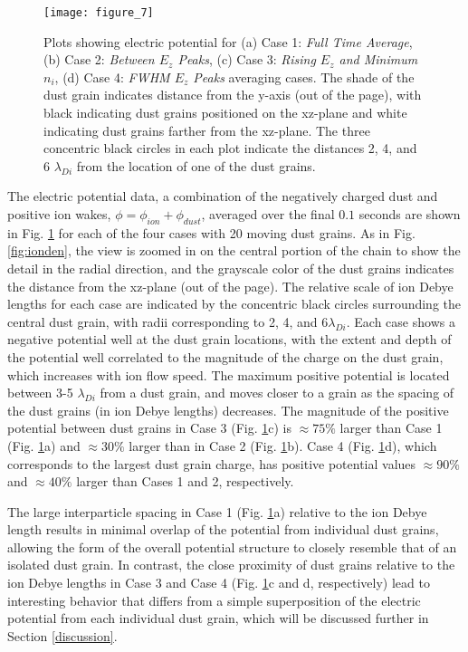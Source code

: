 \documentclass[aip,amsmath,amssymb,graphicx,floatfix,reprint]{revtex4-1}
\begin{document}
\begin{figure}[t]
\texttt{[image: figure\_7]}
\caption{Plots showing electric potential for (a) Case 1: \emph{Full Time Average}, (b) Case 2: \emph{Between $E_z$ Peaks}, (c) Case 3: \emph{Rising $E_z$ and Minimum $n_i$}, (d) Case 4: \emph{FWHM $E_z$ Peaks} averaging cases. The shade of the dust grain indicates distance from the y-axis (out of the page), with black indicating dust grains positioned on the xz-plane and white indicating dust grains farther from the xz-plane.  The three concentric black circles in each plot indicate the distances 2, 4, and 6 $\lambda_{Di}$ from the location of one of the dust grains.}
\label{fig:totalpotential}
\end{figure}
 
 The electric potential data, a combination of the negatively charged dust and positive ion wakes, $\phi = \phi_{ion} + \phi_{dust}$, averaged over the final $0.1$ seconds are shown in Fig. \ref{fig:totalpotential} for each of the four cases with 20 moving dust grains.  As in Fig. \ref{fig:ionden}, the view is zoomed in on the central portion of the chain to show the detail in the radial direction, and the grayscale color of the dust grains indicates the distance from the xz-plane (out of the page).  The relative scale of ion Debye lengths for each case are indicated by the concentric black circles surrounding the central dust grain, with radii corresponding to 2, 4, and 6$\lambda_{Di}$.  Each case shows a negative potential well at the dust grain locations, with the extent and depth of the potential well correlated to the magnitude of the charge on the dust grain, which increases with ion flow speed.  The maximum positive potential is located between 3-5 $\lambda_{Di}$ from a dust grain, and moves closer to a grain as the spacing of the dust grains (in ion Debye lengths) decreases. The magnitude of the positive potential between dust grains in Case 3 (Fig. \ref{fig:totalpotential}c) is $\approx 75\%$ larger than Case 1 (Fig. \ref{fig:totalpotential}a) and $\approx 30\%$ larger than in Case 2 (Fig. \ref{fig:totalpotential}b).  Case 4 (Fig. \ref{fig:totalpotential}d), which corresponds to the largest dust grain charge, has positive potential values $\approx 90\%$ and $\approx 40\%$ larger than Cases 1 and 2, respectively.


The large interparticle spacing in Case 1 (Fig. \ref{fig:totalpotential}a) relative to the ion Debye length results in minimal overlap of the potential from individual dust grains, allowing the form of the overall potential structure to closely resemble that of an isolated dust grain. In contrast, the close proximity of dust grains relative to the ion Debye lengths in Case 3 and Case 4 (Fig. \ref{fig:totalpotential}c and d, respectively) lead to interesting behavior that differs from a simple superposition of the electric potential from each individual dust grain, which will be discussed further in Section \ref{discussion}.
\end{document}
